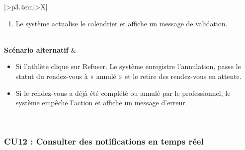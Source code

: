 \documentclass[a4paper,12pt]{report}
\begin{document}
\begin{table}[H]
\begin{tabularx}{\textwidth}{|>{\RaggedRight\arraybackslash}p{3.4cm}|>{\RaggedRight\arraybackslash}X|}
\begin{minipage}[t]{\linewidth}
\begin{enumerate}[label=\arabic*., leftmargin=*, topsep=0pt, itemsep=1pt]
    \item Le système actualise le calendrier et affiche un message de validation.
\end{enumerate}
\vspace{2pt}
\end{minipage} \\
\hline
\textbf{Scénario alternatif} &
\begin{minipage}[t]{\linewidth}\sloppy
\vspace{2pt}
\begin{itemize}[leftmargin=*, topsep=0pt, itemsep=1pt]
    \item  Si l'athlète clique sur Refuser. Le système enregistre l'annulation, passe le statut du rendez-vous à « annulé » et le retire des rendez-vous en attente.
    \item  Si le rendez-vous a déjà été complété ou annulé par le professionnel, le système empêche l'action et affiche un message d'erreur.
\end{itemize}
\vspace{2pt}
\end{minipage} \\
\hline
\end{tabularx}
\fussy
\end{table}
\endgroup
\begingroup

\subsubsection*{CU12 : Consulter des notifications en temps réel}
\end{document}
